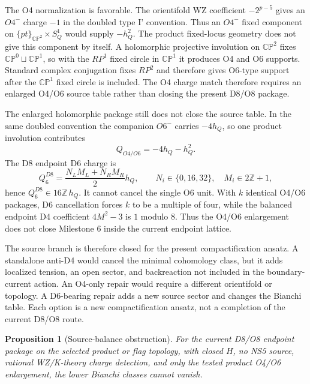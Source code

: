 \documentclass[11pt]{article}
\newcommand{\CP}{\mathbb{CP}}
\theoremstyle{plain}
\newtheorem{proposition}{Proposition}[section]
\theoremstyle{definition}
\begin{document}
The O4 normalization is favorable.  The orientifold WZ coefficient
\(-2^{p-5}\) gives an \(O4^-\) charge \(-1\) in the doubled type I' convention.
Thus an \(O4^-\) fixed component on \(\{pt\}_{\CP^2}\times S^1_Q\) would supply
\(-h_Q^2\).  The product fixed-locus geometry does not give this component by
itself.  A holomorphic projective involution on \(\CP^2\) fixes
\(\CP^0\sqcup\CP^1\), so with the \(RP^1\) fixed circle in \(\CP^1\) it
produces O4 and O6 supports.  Standard complex conjugation fixes \(RP^2\) and
therefore gives O6-type support after the \(\CP^1\) fixed circle is included.
The O4 charge match therefore requires an enlarged O4/O6 source table rather
than closing the present D8/O8 package.

The enlarged holomorphic package still does not close the source table.  In the
same doubled convention the companion \(O6^-\) carries \(-4h_Q\), so one
product involution contributes
\begin{equation}
  Q_{O4/O6}=-4h_Q-h_Q^2 .
\end{equation}
The D8 endpoint D6 charge is
\begin{equation}
  Q_6^{D8}=\frac{N_LM_L+N_RM_R}{2}h_Q,
  \qquad N_i\in\{0,16,32\},\quad M_i\in2\mathbb Z+1,
\end{equation}
hence \(Q_6^{D8}\in16\mathbb Z\,h_Q\).  It cannot cancel the single O6 unit.
With \(k\) identical O4/O6 packages, D6 cancellation forces \(k\) to be a
multiple of four, while the balanced endpoint D4 coefficient \(4M^2-3\) is
\(1\) modulo \(8\).  Thus the O4/O6 enlargement does not close Milestone 6
inside the current endpoint lattice.

The source branch is therefore closed for the present compactification
ansatz.  A standalone anti-D4 would cancel the minimal cohomology class, but it
adds localized tension, an open sector, and backreaction not included in the
boundary-current action.  An O4-only repair would require a different
orientifold or topology.  A D6-bearing repair adds a new source sector and
changes the Bianchi table.  Each option is a new compactification ansatz, not a
completion of the current D8/O8 route.

\begin{proposition}[Source-balance obstruction]
For the current D8/O8 endpoint package on the selected product or flag
topology, with closed \(H\), no NS5 source, rational WZ/K-theory charge
detection, and only the tested product O4/O6 enlargement, the lower Bianchi
classes cannot vanish.
\end{proposition}
\end{document}
